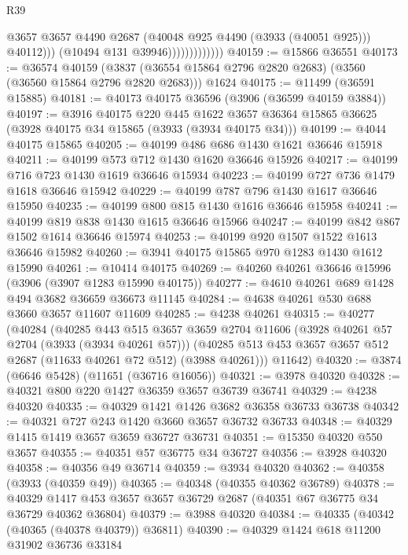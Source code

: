 \begin{lexlean}{R39}
\begin{coremodule}
                                  @3657
                                  @3657
                                  @4490
                                  @2687
                                  (@40048 @925 @4490 (@3933 (@40051 @925)))
                                  @40112)))
                            (@10494 @131 @39946)))))))))))))
@40159 := @15866 @36551
@40173 := @36574
    @40159
    (@3837 (@36554 @15864 @2796 @2820 @2683) (@3560 (@36560 @15864 @2796 @2820 @2683)))
    @1624
@40175 := @11499 (@36591 @15885)
@40181 := @40173 @40175 @36596 (@3906 (@36599 @40159 @3884))
@40197 := @3916
    @40175
    @220
    @445
    @1622
    @3657
    @36364
    @15865
    @36625
    (@3928 @40175 @34 @15865 (@3933 (@3934 @40175 @34)))
@40199 := @4044 @40175 @15865
@40205 := @40199 @486 @686 @1430 @1621 @36646 @15918
@40211 := @40199 @573 @712 @1430 @1620 @36646 @15926
@40217 := @40199 @716 @723 @1430 @1619 @36646 @15934
@40223 := @40199 @727 @736 @1479 @1618 @36646 @15942
@40229 := @40199 @787 @796 @1430 @1617 @36646 @15950
@40235 := @40199 @800 @815 @1430 @1616 @36646 @15958
@40241 := @40199 @819 @838 @1430 @1615 @36646 @15966
@40247 := @40199 @842 @867 @1502 @1614 @36646 @15974
@40253 := @40199 @920 @1507 @1522 @1613 @36646 @15982
@40260 := @3941 @40175 @15865 @970 @1283 @1430 @1612 @15990
@40261 := @10414 @40175
@40269 := @40260 @40261 @36646 @15996 (@3906 (@3907 @1283 @15990 @40175))
@40277 := @4610 @40261 @689 @1428 @494 @3682 @36659 @36673 @11145
@40284 := @4638 @40261 @530 @688 @3660 @3657 @11607 @11609
@40285 := @4238 @40261
@40315 := @40277
    (@40284
      (@40285
        @443
        @515
        @3657
        @3659
        @2704
        @11606
        (@3928 @40261 @57 @2704 (@3933 (@3934 @40261 @57)))
        (@40285 @513 @453 @3657 @3657 @512 @2687 (@11633 @40261 @72 @512) (@3988 @40261)))
      @11642)
@40320 := @3874 (@6646 @5428) (@11651 (@36716 @16056))
@40321 := @3978 @40320
@40328 := @40321 @800 @220 @1427 @36359 @3657 @36739 @36741
@40329 := @4238 @40320
@40335 := @40329 @1421 @1426 @3682 @36358 @36733 @36738
@40342 := @40321 @727 @243 @1420 @3660 @3657 @36732 @36733
@40348 := @40329 @1415 @1419 @3657 @3659 @36727 @36731
@40351 := @15350 @40320 @550 @3657
@40355 := @40351 @57 @36775 @34 @36727
@40356 := @3928 @40320
@40358 := @40356 @49 @36714
@40359 := @3934 @40320
@40362 := @40358 (@3933 (@40359 @49))
@40365 := @40348 (@40355 @40362 @36789)
@40378 := @40329 @1417 @453 @3657 @3657 @36729 @2687 (@40351 @67 @36775 @34 @36729 @40362 @36804)
@40379 := @3988 @40320
@40384 := @40335 (@40342 (@40365 (@40378 @40379)) @36811)
@40390 := @40329 @1424 @618 @11200 @31902 @36736 @33184

\end{coremodule}
\end{lexlean}

